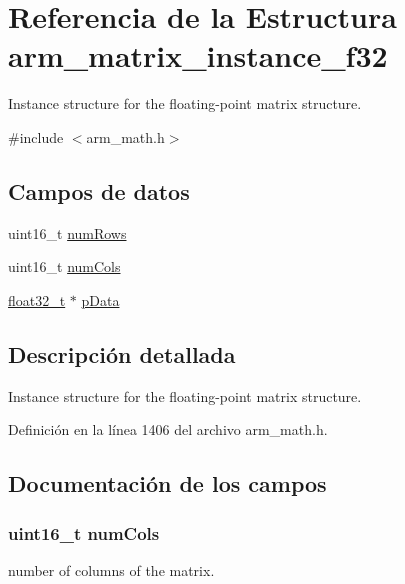 \hypertarget{structarm__matrix__instance__f32}{}\section{Referencia de la Estructura arm\+\_\+matrix\+\_\+instance\+\_\+f32}
\label{structarm__matrix__instance__f32}


Instance structure for the floating-\/point matrix structure.  




{\ttfamily \#include $<$arm\+\_\+math.\+h$>$}

\subsection*{Campos de datos}
\begin{DoxyCompactItemize}
\item 
uint16\+\_\+t \hyperlink{structarm__matrix__instance__f32_a1bcf80ccdc2acc29198f1592ae300390}{num\+Rows}
\item 
uint16\+\_\+t \hyperlink{structarm__matrix__instance__f32_a4bb5ec0d13eb4c9cf887aa8366a44117}{num\+Cols}
\item 
\hyperlink{arm__math_8h_a4611b605e45ab401f02cab15c5e38715}{float32\+\_\+t} $\ast$ \hyperlink{structarm__matrix__instance__f32_af5c3a2f15c98850cdcfbe6f87e5ac5df}{p\+Data}
\end{DoxyCompactItemize}


\subsection{Descripción detallada}
Instance structure for the floating-\/point matrix structure. 

Definición en la línea 1406 del archivo arm\+\_\+math.\+h.



\subsection{Documentación de los campos}
\subsubsection[{\texorpdfstring{num\+Cols}{numCols}}]{\setlength{\rightskip}{0pt plus 5cm}uint16\+\_\+t num\+Cols}\hypertarget{structarm__matrix__instance__f32_a4bb5ec0d13eb4c9cf887aa8366a44117}{}\label{structarm__matrix__instance__f32_a4bb5ec0d13eb4c9cf887aa8366a44117}
number of columns of the matrix. 

